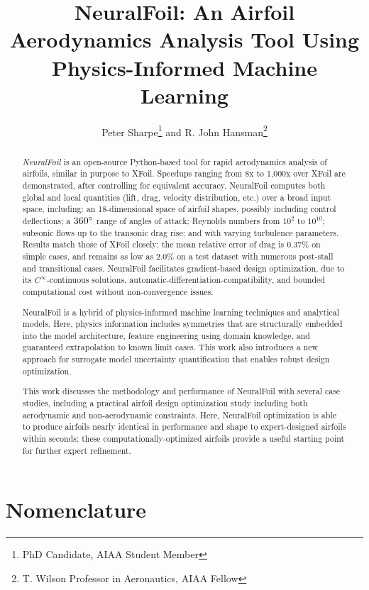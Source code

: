 \documentclass[journal]{new-aiaa}
\title{NeuralFoil: An Airfoil Aerodynamics Analysis Tool Using Physics-Informed Machine Learning}
\author{Peter Sharpe\footnote{PhD Candidate, AIAA Student Member} and R. John Hansman\footnote{T. Wilson Professor in Aeronautics, AIAA Fellow}}
\affil{Massachusetts Institute of Technology, Cambridge, MA}
\begin{document}
\maketitle

\begin{abstract}

    \emph{NeuralFoil} is an open-source Python-based tool for rapid aerodynamics analysis of airfoils, similar in purpose to XFoil. Speedups ranging from 8x to 1,000x over XFoil are demonstrated, after controlling for equivalent accuracy. NeuralFoil computes both global and local quantities (lift, drag, velocity distribution, etc.) over a broad input space, including: an 18-dimensional space of airfoil shapes, possibly including control deflections; a $360\degree$ range of angles of attack; Reynolds numbers from $10^2$ to $10^{10}$; subsonic flows up to the transonic drag rise; and with varying turbulence parameters. Results match those of XFoil closely: the mean relative error of drag is 0.37\% on simple cases, and remains as low as 2.0\% on a test dataset with numerous post-stall and transitional cases. NeuralFoil facilitates gradient-based design optimization, due to its $C^\infty$-continuous solutions, automatic-differentiation-compatibility, and bounded computational cost without non-convergence issues.

    NeuralFoil is a hybrid of physics-informed machine learning techniques and analytical models. Here, physics information includes symmetries that are structurally embedded into the model architecture, feature engineering using domain knowledge, and guaranteed extrapolation to known limit cases. This work also introduces a new approach for surrogate model uncertainty quantification that enables robust design optimization.

    This work discusses the methodology and performance of NeuralFoil with several case studies, including a practical airfoil design optimization study including both aerodynamic and non-aerodynamic constraints. Here, NeuralFoil optimization is able to produce airfoils nearly identical in performance and shape to expert-designed airfoils within seconds; these computationally-optimized airfoils provide a useful starting point for further expert refinement.

\end{abstract}

\section{Nomenclature}
\end{document}
